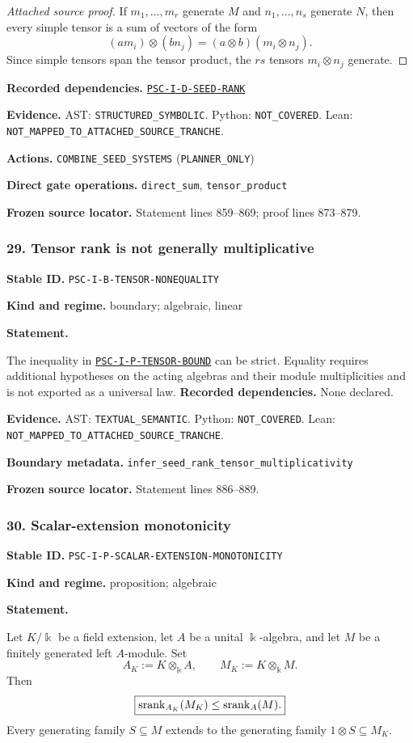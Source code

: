 \documentclass[a4paper,11pt]{article}
\newcommand{\bbk}{\Bbbk}\newcommand{\A}{\mathcal A}\newcommand{\B}{\mathcal B}\newcommand{\Ccal}{\mathcal C}\newcommand{\Pcal}{\mathcal P}\newcommand{\Qcal}{\mathcal Q}\newcommand{\Rcal}{\mathcal R}\newcommand{\Scal}{\mathcal S}
\newcommand{\field}[2]{\noindent\textbf{#1.} #2\par}
\begin{document}
\begin{proof}[Attached source proof]
If $m_1,\ldots,m_r$ generate $M$ and $n_1,\ldots,n_s$ generate $N$, then every simple tensor is a sum of vectors of the form
\[
(am_i)\otimes(bn_j)=(a\otimes b)(m_i\otimes n_j).
\]
Since simple tensors span the tensor product, the $rs$ tensors $m_i\otimes n_j$ generate.
\end{proof}
\field{Recorded dependencies}{\hyperref[rec:PSC-I-D-SEED-RANK]{\nolinkurl{PSC-I-D-SEED-RANK}}}
\field{Evidence}{AST: \nolinkurl{STRUCTURED_SYMBOLIC}. Python: \nolinkurl{NOT_COVERED}. Lean: \nolinkurl{NOT_MAPPED_TO_ATTACHED_SOURCE_TRANCHE}.}
\field{Actions}{\nolinkurl{COMBINE_SEED_SYSTEMS} (\nolinkurl{PLANNER_ONLY})}
\field{Direct gate operations}{\nolinkurl{direct_sum}, \nolinkurl{tensor_product}}
\field{Frozen source locator}{Statement lines 859--869; proof lines 873--879.}
\subsubsection*{29. Tensor rank is not generally multiplicative}
\label{rec:PSC-I-B-TENSOR-NONEQUALITY}
\field{Stable ID}{\nolinkurl{PSC-I-B-TENSOR-NONEQUALITY}}
\field{Kind and regime}{boundary; algebraic, linear}
\textbf{Statement.}\par
The inequality in \hyperref[rec:PSC-I-P-TENSOR-BOUND]{\nolinkurl{PSC-I-P-TENSOR-BOUND}} can be strict.  Equality requires additional hypotheses on the acting algebras and their module multiplicities and is not exported as a universal law.
\field{Recorded dependencies}{None declared.}
\field{Evidence}{AST: \nolinkurl{TEXTUAL_SEMANTIC}. Python: \nolinkurl{NOT_COVERED}. Lean: \nolinkurl{NOT_MAPPED_TO_ATTACHED_SOURCE_TRANCHE}.}
\field{Boundary metadata}{\nolinkurl{infer_seed_rank_tensor_multiplicativity}}
\field{Frozen source locator}{Statement lines 886--889.}
\subsubsection*{30. Scalar-extension monotonicity}
\label{rec:PSC-I-P-SCALAR-EXTENSION-MONOTONICITY}
\field{Stable ID}{\nolinkurl{PSC-I-P-SCALAR-EXTENSION-MONOTONICITY}}
\field{Kind and regime}{proposition; algebraic}
\textbf{Statement.}\par
Let \(K/\bbk\) be a field extension, let \(A\) be a unital \(\bbk\)-algebra, and let \(M\) be a finitely generated left \(A\)-module.  Set
\[
A_K:=K\otimes_{\bbk}A,
\qquad
M_K:=K\otimes_{\bbk}M.
\]
Then
\[
\boxed{
\operatorname{srank}_{A_K}(M_K)\leq\operatorname{srank}_A(M).
}
\]
Every generating family \(S\subseteq M\) extends to the generating family \(1\otimes S\subseteq M_K\).
\end{document}
